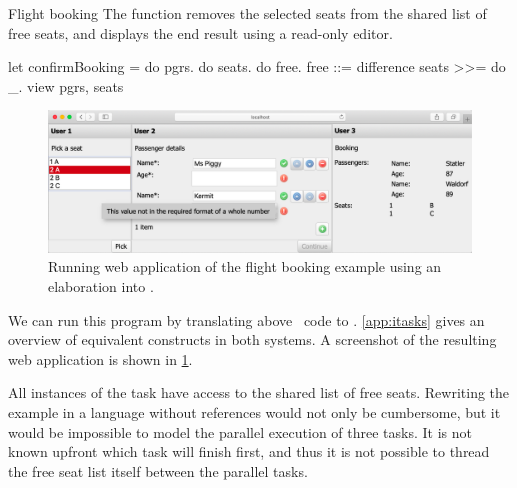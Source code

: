 \begin{example}{Flight booking}
  The function  removes the selected seats from the shared list of free seats,
  and displays the end result using a read-only editor.
  \begin{TASK}[emph={name,age,seats,pgrs,free}]
    let confirmBooking = do pgrs. do seats. do free.
      free ::= difference seats >>= do  _.
      view {pgrs, seats}
  \end{TASK}

  \begin{figure}
    \label{fig:flight-booking}
    \includegraphics[width=\columnwidth]{figures/flight-booking.png}
    \caption{Running web application of the flight booking example using an elaboration into \ITASKS.}
  \end{figure}

  We can run this program by translating above \TOPHAT\ code to \ITASKS.
  \cref{app:itasks} gives an overview of equivalent constructs in both systems.
  A screenshot of the resulting web application is shown in \cref{fig:flight-booking}.

  All instances of the  task have access to the shared list of free seats.
  Rewriting the example in a language without references would not only be cumbersome,
  but it would be impossible to model the parallel execution of three  tasks.
  It is not known upfront which task will finish first,
  and thus it is not possible to thread the free seat list itself between the parallel tasks.
\end{example}

